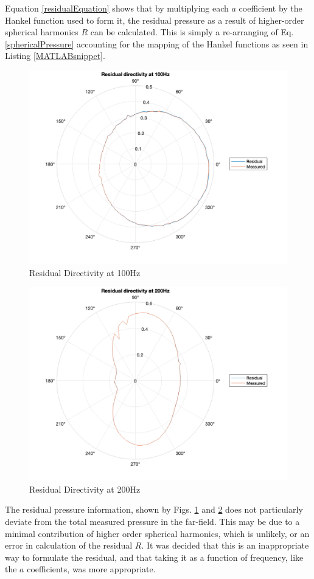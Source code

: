 \documentclass{report}
\begin{document}
    Equation \ref{residualEquation} shows that by multiplying each $a$ coefficient by the Hankel function used to form it, the residual pressure as a result of higher-order spherical harmonics $R$ can be calculated.
    This is simply a re-arranging of Eq. \ref{sphericalPressure} accounting for the mapping of the Hankel functions as seen in Listing \ref{MATLABsnippet}.

    \begin{figure}[H]
        \centering
        \includegraphics[width=0.8\linewidth]{figs/residual100.png}
        \caption{Residual Directivity at 100Hz}
        \label{residual100}
    \end{figure}

    \begin{figure}[H]
        \centering
        \includegraphics[width=0.8\linewidth]{figs/residual200.png}
        \caption{Residual Directivity at 200Hz}
        \label{residual200}
    \end{figure}

    The residual pressure information, shown by Figs. \ref{residual100} and \ref{residual200} does not particularly deviate from the total measured pressure in the far-field.
    This may be due to a minimal contribution of higher order spherical harmonics, which is unlikely, or an error in calculation of the residual $R$.
    It was decided that this is an inappropriate way to formulate the residual, and that taking it as a function of frequency, like the $a$ coefficients, was more appropriate.
\end{document}

